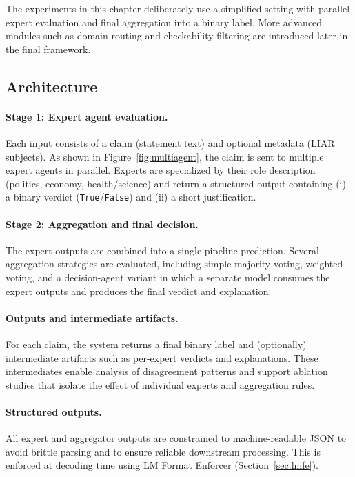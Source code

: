 The experiments in this chapter deliberately use a simplified setting with parallel expert evaluation and final aggregation into a binary label.
More advanced modules such as domain routing and checkability filtering are introduced later in the final framework.

\subsection{Architecture}

\paragraph{Stage 1: Expert agent evaluation.}
Each input consists of a claim (statement text) and optional metadata (LIAR subjects).
As shown in Figure~\ref{fig:multiagent}, the claim is sent to multiple expert agents in parallel.
Experts are specialized by their role description (politics, economy, health/science) and return a structured output containing
(i) a binary verdict (\texttt{True}/\texttt{False}) and
(ii) a short justification.

\paragraph{Stage 2: Aggregation and final decision.}
The expert outputs are combined into a single pipeline prediction.
Several aggregation strategies are evaluated, including simple majority voting, weighted voting, and a decision-agent variant in which a separate model consumes the expert outputs and produces the final verdict and explanation.

\paragraph{Outputs and intermediate artifacts.}
For each claim, the system returns a final binary label and (optionally) intermediate artifacts such as per-expert verdicts and explanations.
These intermediates enable analysis of disagreement patterns and support ablation studies that isolate the effect of individual experts and aggregation rules.

\paragraph{Structured outputs.}
All expert and aggregator outputs are constrained to machine-readable JSON to avoid brittle parsing and to ensure reliable downstream processing.
This is enforced at decoding time using LM Format Enforcer (Section~\ref{sec:lmfe}). 


